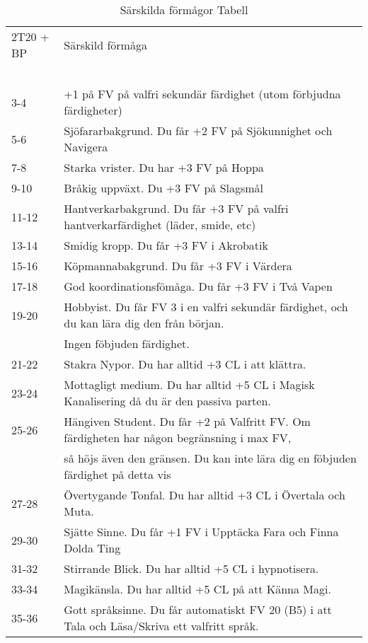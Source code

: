\documentclass[a4paper, 10pt, titlepage]{article}
\begin{document}
\begin{table}[hbp]
  \caption{Särskilda förmågor Tabell}
 \begin{tabular}{|l|l|}
   \hline
   2T20 + BP & Särskild förmåga \\
   ~         & ~                \\
   \hline
   3-4       & +1 på FV på valfri sekundär färdighet (utom förbjudna färdigheter) \\
   5-6       & Sjöfararbakgrund. Du får +2 FV på Sjökunnighet och Navigera \\
   7-8       & Starka vrister. Du har +3 FV på Hoppa \\
   9-10      & Bråkig uppväxt. Du +3 FV på Slagsmål \\
   11-12     & Hantverkarbakgrund. Du får +3 FV på valfri hantverkarfärdighet (läder, smide, etc) \\
   13-14     & Smidig kropp. Du får +3 FV i Akrobatik \\
   15-16     & Köpmannabakgrund. Du får +3 FV i Värdera \\
   17-18     & God koordinationsfömåga. Du får +3 FV i Två Vapen \\
   19-20     & Hobbyist. Du får FV 3 i en valfri sekundär färdighet, och du kan lära dig den från början.   \\
   ~         & Ingen föbjuden färdighet. \\
   21-22     & Stakra Nypor. Du har alltid +3 CL i att klättra. \\
   23-24     & Mottagligt medium. Du har alltid +5 CL i Magisk Kanalisering då du är den passiva parten. \\
   25-26     & Hängiven Student. Du får +2 på Valfritt FV. Om färdigheten har någon begränsning i max FV, \\
   ~         & så höjs även den gränsen. Du kan inte lära dig en föbjuden färdighet på detta vis \\
   27-28     & Övertygande Tonfal. Du har alltid +3 CL i Övertala och Muta. \\
   29-30     & Sjätte Sinne. Du får +1 FV i Upptäcka Fara och Finna Dolda Ting \\
   31-32     & Stirrande Blick. Du har alltid +5 CL i hypnotisera. \\
   33-34     & Magikänsla. Du har alltid +5 CL på att Känna Magi. \\
   35-36     & Gott språksinne. Du får automatiskt FV 20 (B5) i att Tala och Läsa/Skriva ett valfritt språk. \\

\end{tabular}
\end{table}
\end{document}
